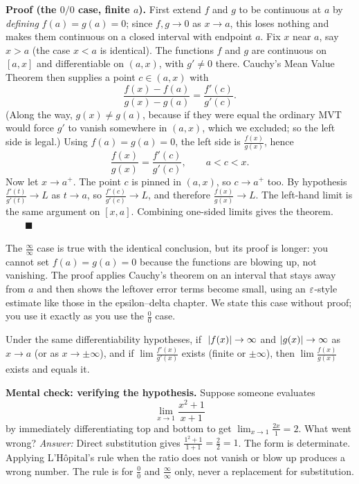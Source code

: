 \begin{focusbox}
\textbf{Proof (the $0/0$ case, finite $a$).}
First extend $f$ and $g$ to be continuous at $a$ by \emph{defining} $f(a)=g(a)=0$;
since $f,g\to 0$ as $x\to a$, this loses nothing and makes them continuous on a closed
interval with endpoint $a$. Fix $x$ near $a$, say $x>a$ (the case $x<a$ is identical).
The functions $f$ and $g$ are continuous on $[a,x]$ and differentiable on $(a,x)$, with
$g'\neq 0$ there. Cauchy's Mean Value Theorem then supplies a point $c\in(a,x)$ with
\[
\frac{f(x)-f(a)}{g(x)-g(a)}=\frac{f'(c)}{g'(c)}.
\]
(Along the way, $g(x)\neq g(a)$, because if they were equal the ordinary MVT would force
$g'$ to vanish somewhere in $(a,x)$, which we excluded; so the left side is legal.)
Using $f(a)=g(a)=0$, the left side is $\tfrac{f(x)}{g(x)}$, hence
\[
\frac{f(x)}{g(x)}=\frac{f'(c)}{g'(c)},\qquad a<c<x.
\]
Now let $x\to a^+$. The point $c$ is pinned in $(a,x)$, so $c\to a^+$ too. By
hypothesis $\tfrac{f'(t)}{g'(t)}\to L$ as $t\to a$, so $\tfrac{f'(c)}{g'(c)}\to L$, and
therefore $\tfrac{f(x)}{g(x)}\to L$. The left-hand limit is the same argument on
$[x,a]$. Combining one-sided limits gives the theorem. $\qquad\blacksquare$
\end{focusbox}

\begin{remark}
The $\tfrac{\infty}{\infty}$ case is true with the identical conclusion, but its proof
is longer: you cannot set $f(a)=g(a)=0$ because the functions are blowing
up, not vanishing. The proof applies Cauchy's theorem on an interval that stays away
from $a$ and then shows the leftover error terms become small, using an
$\varepsilon$-style estimate like those in the epsilon--delta chapter. We state this case
without proof; you use it exactly as you use the $\tfrac00$ case.
\end{remark}

\begin{theorem}\label{ch18:thm-lhopital-inf}
Under the same differentiability hypotheses, if $\;\lvert f(x)\rvert\to\infty$ and
$\lvert g(x)\rvert\to\infty$ as $x\to a$ (or as $x\to\pm\infty$), and if
$\lim \tfrac{f'(x)}{g'(x)}$ exists (finite or $\pm\infty$), then
$\lim \tfrac{f(x)}{g(x)}$ exists and equals it.
\end{theorem}

\begin{recoverybox}
\textbf{Mental check: verifying the hypothesis.}
Suppose someone evaluates
\[
\lim_{x\to 1}\frac{x^2+1}{x+1}
\]
by immediately differentiating top and bottom to get $\lim_{x\to 1}\frac{2x}{1} = 2$.
What went wrong?
\emph{Answer:} Direct substitution gives $\frac{1^2+1}{1+1} = \frac{2}{2} = 1$. The form
is determinate. Applying L'H\^opital's rule when the ratio does not vanish or
blow up produces a wrong number. The rule is for
$\tfrac{0}{0}$ and $\tfrac{\infty}{\infty}$ only, never a replacement for substitution.
\end{recoverybox}

